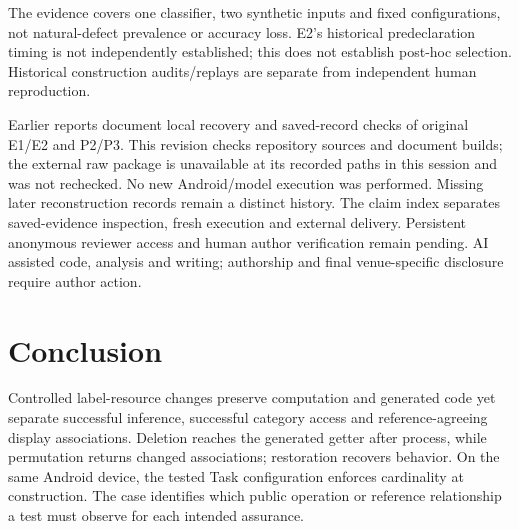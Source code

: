 \documentclass[10pt,conference]{IEEEtran}
\begin{document}
\label{sec:validity}
The evidence covers one classifier, two synthetic inputs and fixed configurations, not natural-defect prevalence or accuracy loss. E2's historical predeclaration timing is not independently established; this does not establish post-hoc selection. Historical construction audits/replays are separate from independent human reproduction.

Earlier reports document local recovery and saved-record checks of original E1/E2 and P2/P3. This revision checks repository sources and document builds; the external raw package is unavailable at its recorded paths in this session and was not rechecked. No new Android/model execution was performed. Missing later reconstruction records remain a distinct history. The claim index separates saved-evidence inspection, fresh execution and external delivery. Persistent anonymous reviewer access and human author verification remain pending. AI assisted code, analysis and writing; authorship and final venue-specific disclosure require author action.

\section{Conclusion}
Controlled label-resource changes preserve computation and generated code yet separate successful inference, successful category access and reference-agreeing display associations. Deletion reaches the generated getter after process, while permutation returns changed associations; restoration recovers behavior. On the same Android device, the tested Task configuration enforces cardinality at construction. The case identifies which public operation or reference relationship a test must observe for each intended assurance.
\end{document}
